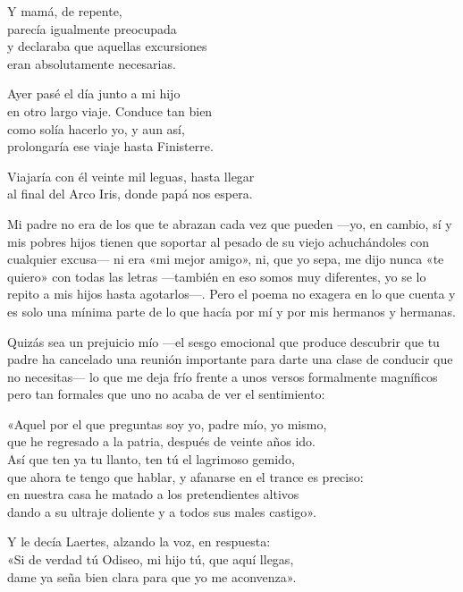 \begin{versopropio}
Y mamá, de repente,\\
parecía igualmente preocupada\\
y declaraba que aquellas excursiones\\
eran absolutamente necesarias.

Ayer pasé el día junto a mi hijo\\
en otro largo viaje. Conduce tan bien\\
como solía hacerlo yo, y aun así,\\
prolongaría ese viaje hasta Finisterre.

Viajaría con él veinte mil leguas, hasta llegar\\
al final del Arco Iris, donde papá nos espera.
\end{versopropio}

Mi padre no era de los que te abrazan cada vez que pueden ---yo, en cambio, sí y mis pobres hijos tienen que soportar al pesado de su viejo achuchándoles con cualquier excusa--- ni era «mi mejor amigo», ni, que yo sepa, me dijo nunca «te quiero» con todas las letras ---también en eso somos muy diferentes, yo se lo repito a mis hijos hasta agotarlos---. Pero el poema no exagera en lo que cuenta y es solo una mínima parte de lo que hacía por mí y por mis hermanos y hermanas.

Quizás sea un prejuicio mío ---el sesgo emocional que produce descubrir que tu padre ha cancelado una reunión importante para darte una clase de conducir que no necesitas--- lo que me deja frío frente a unos versos formalmente magníficos pero tan formales que uno no acaba de ver el sentimiento:

\begin{versocita}
«Aquel por el que preguntas soy yo, padre mío, yo mismo,\\
que he regresado a la patria, después de veinte años ido.\\
Así que ten ya tu llanto, ten tú el lagrimoso gemido,\\
que ahora te tengo que hablar, y afanarse en el trance es preciso:\\
en nuestra casa he matado a los pretendientes altivos\\
dando a su ultraje doliente y a todos sus males castigo».
\end{versocita}

\begin{versocita}
Y le decía Laertes, alzando la voz, en respuesta:\\
«Si de verdad tú Odiseo, mi hijo tú, que aquí llegas,\\
dame ya seña bien clara para que yo me aconvenza».
\end{versocita}


